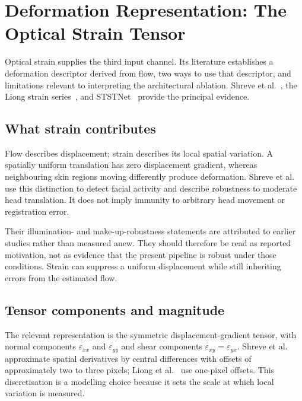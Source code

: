 
\section{Deformation Representation: The Optical Strain Tensor}
\label{sec:strain-review}

Optical strain supplies the third input channel. Its literature establishes a deformation descriptor derived from flow, two ways to use that descriptor, and limitations relevant to interpreting the architectural ablation. Shreve et al.~\cite{shreve2011}, the Liong strain series~\cite{liong2014a,liong2014b,liong2016}, and STSTNet~\cite{liong2019b} provide the principal evidence.

\subsection{What strain contributes}
\label{sec:strain-what-adds}

Flow describes displacement; strain describes its local spatial variation. A spatially uniform translation has zero displacement gradient, whereas neighbouring skin regions moving differently produce deformation. Shreve et al.~\cite{shreve2011} use this distinction to detect facial activity and describe robustness to moderate head translation. It does not imply immunity to arbitrary head movement or registration error.

Their illumination- and make-up-robustness statements are attributed to earlier studies rather than measured anew. They should therefore be read as reported motivation, not as evidence that the present pipeline is robust under those conditions. Strain can suppress a uniform displacement while still inheriting errors from the estimated flow.

\subsection{Tensor components and magnitude}
\label{sec:strain-tensor}

The relevant representation is the symmetric displacement-gradient tensor, with normal components $\varepsilon_{xx}$ and $\varepsilon_{yy}$ and shear components $\varepsilon_{xy}=\varepsilon_{yx}$. Shreve et al.~\cite{shreve2011} approximate spatial derivatives by central differences with offsets of approximately two to three pixels; Liong et al.~\cite{liong2014a} use one-pixel offsets. This discretisation is a modelling choice because it sets the scale at which local variation is measured.

